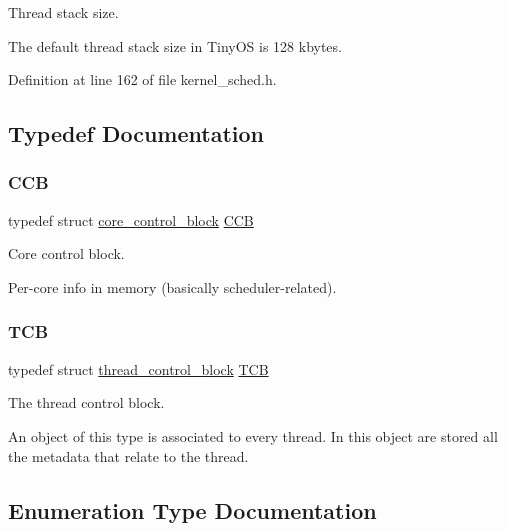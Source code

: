 Thread stack size. 

The default thread stack size in Tiny\+OS is 128 kbytes. 

Definition at line 162 of file kernel\+\_\+sched.\+h.



\subsection{Typedef Documentation}
\mbox{\label{group__scheduler_ga7485b31e0dd9fd723bc2d75fba5206a0}} 
\subsubsection{\texorpdfstring{C\+CB}{CCB}}
{\footnotesize\ttfamily typedef struct \hyperlink{structcore__control__block}{core\+\_\+control\+\_\+block}  \hyperlink{group__scheduler_ga7485b31e0dd9fd723bc2d75fba5206a0}{C\+CB}}



Core control block. 

Per-\/core info in memory (basically scheduler-\/related). \mbox{\label{group__scheduler_gaf88d9c946bf70b36a1e8bc34383abfc9}} 
\subsubsection{\texorpdfstring{T\+CB}{TCB}}
{\footnotesize\ttfamily typedef struct \hyperlink{structthread__control__block}{thread\+\_\+control\+\_\+block}  \hyperlink{group__scheduler_gaf88d9c946bf70b36a1e8bc34383abfc9}{T\+CB}}



The thread control block. 

An object of this type is associated to every thread. In this object are stored all the metadata that relate to the thread. 

\subsection{Enumeration Type Documentation}
\mbox{\label{group__scheduler_gaad787d8d80312ffca3c0f197b3a25fbe}} 
